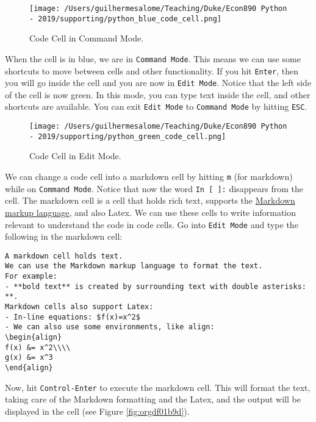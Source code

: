 \documentclass[12pt, a4paper]{article}
\begin{document}
\begin{figure}[htbp]
\centering
\texttt{[image: /Users/guilhermesalome/Teaching/Duke/Econ890 Python - 2019/supporting/python\_blue\_code\_cell.png]}
\caption{\label{fig:org0fe2f02}
Code Cell in Command Mode.}
\end{figure}

When the cell is in blue, we are in \texttt{Command Mode}.
This means we can use some shortcuts to move between cells and other functionality.
If you hit \texttt{Enter}, then you will go inside the cell and you are now in \texttt{Edit Mode}.
Notice that the left side of the cell is now green.
In this mode, you can type text inside the cell, and other shortcuts are available.
You can exit \texttt{Edit Mode} to \texttt{Command Mode} by hitting \texttt{ESC}.

\begin{figure}[htbp]
\centering
\texttt{[image: /Users/guilhermesalome/Teaching/Duke/Econ890 Python - 2019/supporting/python\_green\_code\_cell.png]}
\caption{\label{fig:org939f7c7}
Code Cell in Edit Mode.}
\end{figure}

We can change a code cell into a markdown cell by hitting \texttt{m} (for markdown) while on \texttt{Command Mode}.
Notice that now the word \texttt{In [ ]:} disappears from the cell.
The markdown cell is a cell that holds rich text, supports the \href{https://www.markdownguide.org/basic-syntax}{Markdown markup language}, and also Latex.
We can use these cells to write information relevant to understand the code in code cells.
Go into \texttt{Edit Mode} and type the following in the markdown cell:

\begin{verbatim}
A markdown cell holds text.
We can use the Markdown markup language to format the text.
For example:
- **bold text** is created by surrounding text with double asterisks: **.
Markdown cells also support Latex:
- In-line equations: $f(x)=x^2$
- We can also use some environments, like align:
\begin{align}
f(x) &= x^2\\\\
g(x) &= x^3
\end{align}
\end{verbatim}

Now, hit \texttt{Control-Enter} to execute the markdown cell.
This will format the text, taking care of the Markdown formatting and the Latex, and the output will be displayed in the cell (see Figure \ref{fig:orgdf01b9d}).
\end{document}
